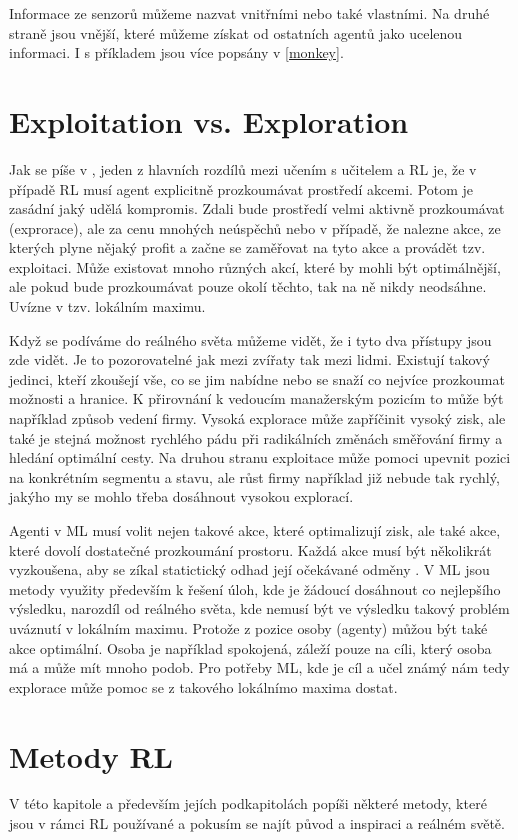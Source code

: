 \documentclass{article}
\begin{document}
Informace ze senzorů můžeme nazvat vnitřními nebo také vlastními. Na druhé straně jsou vnější, které můžeme získat od ostatních agentů jako ucelenou informaci. I s příkladem jsou více popsány v \ref{monkey}.


\section{Exploitation vs. Exploration}
Jak se píše v \cite{kaelbling1996reinforcement}, jeden z hlavních rozdílů mezi učením s učitelem a RL je, že v případě RL musí agent explicitně prozkoumávat prostředí akcemi. Potom je zasádní jaký udělá kompromis. Zdali bude prostředí velmi aktivně prozkoumávat (exprorace), ale za cenu mnohých neúspěchů nebo v případě, že nalezne akce, ze kterých plyne nějaký profit a začne se zaměřovat na tyto akce a provádět tzv. exploitaci. Může existovat mnoho různých akcí, které by mohli být optimálnější, ale pokud bude prozkoumávat pouze okolí těchto, tak na ně nikdy neodsáhne. Uvízne v tzv. lokálním maximu.

Když se podíváme do reálného světa můžeme vidět, že i tyto dva přístupy jsou zde vidět. Je to pozorovatelné jak mezi zvířaty tak mezi lidmi. Existují takový jedinci, kteří zkoušejí vše, co se jim nabídne nebo se snaží co nejvíce prozkoumat možnosti a hranice. K přirovnání k vedoucím manažerským pozicím to může být například způsob vedení firmy. Vysoká explorace může zapříčinit vysoký zisk, ale také je stejná možnost rychlého pádu při radikálních změnách směřování firmy a hledání optimální cesty. Na druhou stranu exploitace může pomoci upevnit pozici na konkrétním segmentu a stavu, ale růst firmy například již nebude tak rychlý, jakýho my se mohlo třeba dosáhnout vysokou explorací.

Agenti v ML musí volit nejen takové akce, které optimalizují zisk, ale také akce, které dovolí dostatečné prozkoumání prostoru. Každá akce musí být několikrát vyzkoušena, aby se zíkal statictický odhad její očekávané odměny \cite{sutton1998introduction}. V ML jsou metody využity především k řešení úloh, kde je žádoucí dosáhnout co nejlepšího výsledku, narozdíl od reálného světa, kde nemusí být ve výsledku takový problém uváznutí v lokálním maximu. Protože z pozice osoby (agenty) můžou být také akce optimální. Osoba je například spokojená, záleží pouze na cíli, který osoba má a může mít mnoho podob. Pro potřeby ML, kde je cíl a učel známý nám tedy explorace může pomoc se z takového lokálnímo maxima dostat. 


\section{Metody RL}
V této kapitole a především jejích podkapitolách popíši některé metody, které jsou v rámci RL používané a pokusím se najít původ a inspiraci a reálném světě.  
\end{document}
